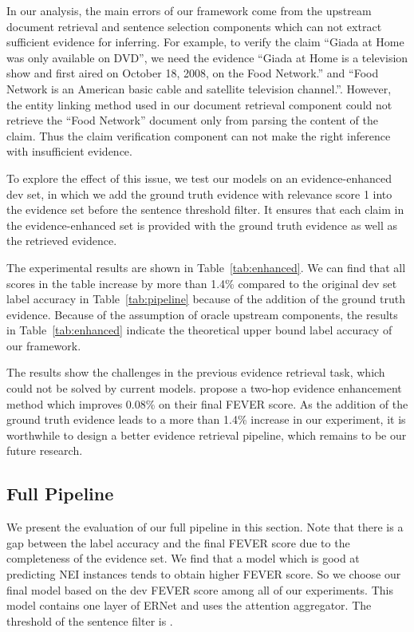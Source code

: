 \documentclass[11pt,a4paper]{article}
\begin{document}
In our analysis, the main errors of our framework come from the upstream document retrieval and sentence selection components which can not extract sufficient evidence for inferring. For example, to verify the claim ``Giada at Home was only available on DVD'', we need the evidence ``Giada at Home is a television show and first aired on October 18, 2008, on the Food Network.'' and ``Food Network is an American basic cable and satellite television channel.''. However, the entity linking method used in our document retrieval component could not retrieve the ``Food Network'' document only from parsing the content of the claim. Thus the claim verification component can not make the right inference with insufficient evidence. 

To explore the effect of this issue, we test our models on an evidence-enhanced dev set, in which we add the ground truth evidence with relevance score 1 into the evidence set before the sentence threshold filter. It ensures that each claim in the evidence-enhanced set is provided with the ground truth evidence as well as the retrieved evidence. 

The experimental results are shown in Table~\ref{tab:enhanced}. We can find that all scores in the table increase by more than 1.4\% compared to the original dev set label accuracy in Table~\ref{tab:pipeline} because of the addition of the ground truth evidence. Because of the assumption of oracle upstream components, the results in Table~\ref{tab:enhanced} indicate the theoretical upper bound label accuracy of our framework.

The results show the challenges in the previous evidence retrieval task, which could not be solved by current models.  propose a two-hop evidence enhancement method which improves 0.08\% on their final FEVER score. As the addition of the ground truth evidence leads to a more than 1.4\% increase in our experiment, it is worthwhile to design a better evidence retrieval pipeline, which remains to be our future research.


\subsection{Full Pipeline}
We present the evaluation of our full pipeline in this section. Note that there is a gap between the label accuracy and the final FEVER score due to the completeness of the evidence set. We find that a model which is good at predicting NEI instances tends to obtain higher FEVER score. 
So we choose our final model based on the dev FEVER score among all of our experiments. 
This model contains one layer of ERNet and uses the attention aggregator. The threshold of the sentence filter is .
\end{document}
